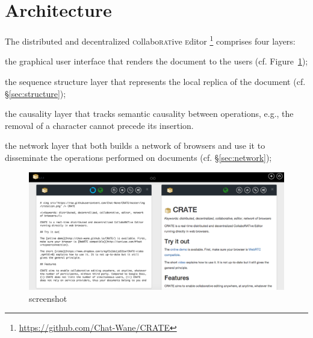 
\section{Architecture}
\label{sec:architecture}

The distributed and decentralized \textsc{c}ollabo\textsc{rat}ive
\textsc{e}ditor \CRATE\footnote{\url{https://github.com/Chat-Wane/CRATE}}
comprises four layers:
\begin{inparaenum}[(i)]
\item the graphical user interface that renders the document to the users
  (cf. Figure~\ref{img:screenshot});
\item the sequence structure layer that represents the local replica of the
  document (cf. §\ref{sec:structure});
\item the causality layer that tracks semantic causality between operations,
  e.g., the removal of a character cannot precede its insertion.
\item the network layer that both builds a network of browsers and use it to
  disseminate the operations performed on documents (cf. §\ref{sec:network});
\end{inparaenum}

\begin{figure}
  \includegraphics[width=\textwidth]{./img/screenshot.png}
  \caption{\label{img:screenshot} \CRATE screenshot}
\end{figure}


